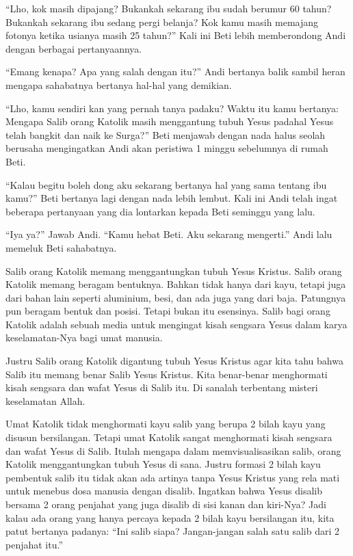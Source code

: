 ``Lho, kok masih dipajang? Bukankah sekarang ibu sudah berumur 60 tahun? Bukankah sekarang ibu sedang pergi belanja? Kok kamu masih memajang fotonya ketika usianya masih 25 tahun?'' Kali ini Beti lebih memberondong Andi dengan berbagai pertanyaannya.

``Emang kenapa? Apa yang salah dengan itu?'' Andi bertanya balik sambil heran mengapa sahabatnya bertanya hal-hal yang demikian.

``Lho, kamu sendiri kan yang pernah tanya padaku? Waktu itu kamu bertanya: Mengapa Salib orang Katolik masih menggantung tubuh Yesus padahal Yesus telah bangkit dan naik ke Surga?'' Beti menjawab dengan nada halus seolah berusaha mengingatkan Andi akan peristiwa 1 minggu sebelumnya di rumah Beti.

``Kalau begitu boleh dong aku sekarang bertanya hal yang sama tentang ibu kamu?'' Beti bertanya lagi dengan nada lebih lembut. Kali ini Andi telah ingat beberapa pertanyaan yang dia lontarkan kepada Beti seminggu yang lalu.

``Iya ya?'' Jawab Andi. ``Kamu hebat Beti. Aku sekarang mengerti.'' Andi lalu memeluk Beti sahabatnya.

Salib orang Katolik memang menggantungkan tubuh Yesus Kristus. Salib orang Katolik memang beragam bentuknya. Bahkan tidak hanya dari kayu, tetapi juga dari bahan lain seperti aluminium, besi, dan ada juga yang dari baja. Patungnya pun beragam bentuk dan posisi. Tetapi bukan itu esensinya. Salib bagi orang Katolik adalah sebuah media untuk mengingat kisah sengsara Yesus dalam karya keselamatan-Nya bagi umat manusia.

Justru Salib orang Katolik digantung tubuh Yesus Kristus agar kita tahu bahwa Salib itu memang benar Salib Yesus Kristus. Kita benar-benar menghormati kisah sengsara dan wafat Yesus di Salib itu. Di sanalah terbentang misteri keselamatan Allah.

Umat Katolik tidak menghormati kayu salib yang berupa 2 bilah kayu yang disusun bersilangan. Tetapi umat Katolik sangat menghormati kisah sengsara dan wafat Yesus di Salib. Itulah mengapa dalam memvisualisasikan salib, orang Katolik menggantungkan tubuh Yesus di sana. Justru formasi 2 bilah kayu pembentuk salib itu tidak akan ada artinya tanpa Yesus Kristus yang rela mati untuk menebus dosa manusia dengan disalib. Ingatkan bahwa Yesus disalib bersama 2 orang penjahat yang juga disalib di sisi kanan dan kiri-Nya? Jadi kalau ada orang yang hanya percaya kepada 2 bilah kayu bersilangan itu, kita patut bertanya padanya: ``Ini salib siapa? Jangan-jangan salah satu salib dari 2 penjahat itu.''

